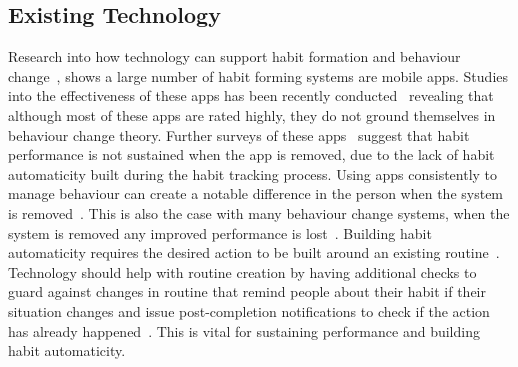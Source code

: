 
\subsection{Existing Technology}
Research into how technology can support habit formation and behaviour change~\cite{survey_on_current_apps_of_steel}, shows a large number of habit forming systems are mobile apps. Studies into the effectiveness of these apps has been recently conducted~\cite{article_beyond_self_tracking_designing_apps, article_dont_kick_habit} revealing that although most of these apps are rated highly, they do not ground themselves in behaviour change theory. Further surveys of these apps~\cite{survey_on_apps_2} suggest that habit performance is not sustained when the app is removed, due to the lack of habit automaticity built during the habit tracking process. Using apps consistently to manage behaviour can create a notable difference in the person when the system is removed~\cite{article_my_phone_is_part_of_my_soul}.
This is also the case with many behaviour change systems, when the system is removed any improved performance is lost~\cite{article_dont_kick_habit, article_realtime_feedback_improving_medication_taking}. Building habit automaticity requires the desired action to be built around an existing routine~\cite{article_how_habits_formed_modelling_habit_formation, article_implementation_intentions_multicue}. Technology should help with routine creation by having additional checks to guard against changes in routine that remind people about their habit if their situation changes and issue post-completion notifications to check if the action has already happened~\cite{article_dont_forget_your_pill}. This is vital for sustaining performance and building habit automaticity.

